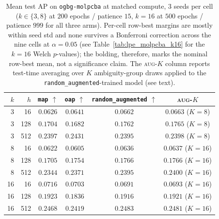 \documentclass{article}
\begin{document}
\begin{table}[h]
\centering
\caption{Mean test AP on \texttt{ogbg-molpcba} at matched compute,
$3$ seeds per cell ($k\!\in\!\{3,8\}$ at $200$ epochs / patience $15$,
$k\!=\!16$ at $500$ epochs / patience $999$ for all three arms).
Per-cell row-best margins are mostly within seed std and none survives
a Bonferroni correction across the nine cells at $\alpha\!=\!0.05$
(see Table~\ref{tab:lpe_molpcba_k16} for the $k\!=\!16$ Welch
$p$-values); the bolding, therefore, marks the nominal row-best mean,
not a significance claim. The \textsc{aug-$K$} column reports
test-time averaging over $K$ ambiguity-group draws applied to the
\texttt{random\_augmented}-trained model (see text).}
\label{tab:lpe_molpcba_main}
\begin{tabular}{rrcccc}
\toprule
$k$  &  $h$  & \texttt{map} $\uparrow$ & \texttt{oap} $\uparrow$ & \texttt{random\_augmented} $\uparrow$ & \textsc{aug-$K$} \\
\midrule
 3   &   16  & $0.0626$        & $0.0641$        & $\mathbf{0.0662}$           & $0.0663$ ($K\!=\!8$)  \\
 3   &  128  & $0.1704$        & $0.1682$        & $\mathbf{0.1762}$           & $0.1765$ ($K\!=\!8$)  \\
 3   &  512  & $0.2397$        & $\mathbf{0.2431}$ & $0.2395$                  & $0.2398$ ($K\!=\!8$)  \\
\midrule
 8   &   16  & $0.0622$        & $0.0605$        & $\mathbf{0.0636}$           & $0.0637$ ($K\!=\!16$) \\
 8   &  128  & $0.1705$        & $0.1754$        & $\mathbf{0.1766}$           & $0.1766$ ($K\!=\!16$) \\
 8   &  512  & $0.2344$        & $0.2371$        & $\mathbf{0.2395}$           & $0.2400$ ($K\!=\!16$) \\
\midrule
16   &   16  & $\mathbf{0.0716}$ & $0.0703$      & $0.0691$                    & $0.0693$ ($K\!=\!16$) \\
16   &  128  & $\mathbf{0.1923}$ & $0.1836$      & $0.1916$                    & $0.1921$ ($K\!=\!16$) \\
16   &  512  & $0.2468$        & $0.2419$        & $\mathbf{0.2483}$           & $0.2481$ ($K\!=\!16$) \\
\bottomrule
\end{tabular}
\end{table}
\end{document}
